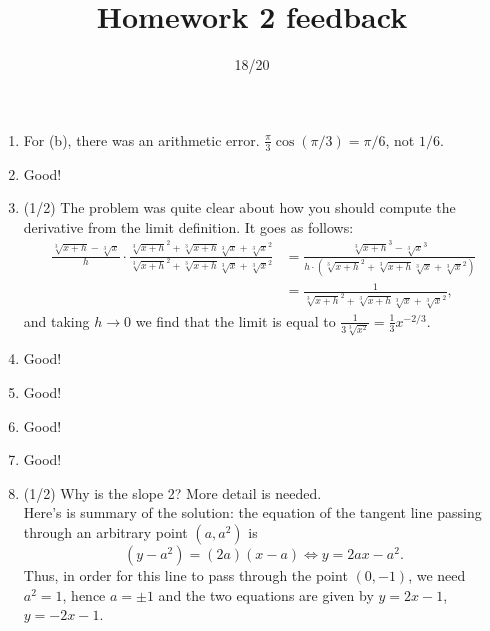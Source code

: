 \documentclass{article}
\title{Homework 2 feedback}
\author{}
\date{18/20}
\begin{document}
\maketitle
\begin{enumerate}
	\item For (b), there was an arithmetic error. $\frac{\pi}{3} \cos(\pi/3) = \pi/6$, not $1/6$.
	\item Good!
	\item (1/2) The problem was quite clear about how you should compute the derivative from the limit definition. It goes as follows:
		\begin{align*}
			\frac{\sqrt[3]{x+h} - \sqrt[3]{x}}{h} \cdot \frac{\sqrt[3]{x+h}^{2} + \sqrt[3]{x+h} \sqrt[3]{x} + \sqrt[3]{x}^{2}}{\sqrt[3]{x+h}^{2} + \sqrt[3]{x+h} \sqrt[3]{x} + \sqrt[3]{x}^{2}} &= \frac{\sqrt[3]{x+h}^{3} - \sqrt[3]{x}^{3}}{h \cdot (\sqrt[3]{x+h}^{2} + \sqrt[3]{x+h} \sqrt[3]{x} + \sqrt[3]{x}^{2})}\\
			&= \frac{1}{\sqrt[3]{x+h}^{2} + \sqrt[3]{x+h} \sqrt[3]{x} + \sqrt[3]{x}^{2}},
		\end{align*}
		and taking $h \to 0$ we find that the limit is equal to $\frac{1}{3 \sqrt[3]{x^{2}}} = \frac{1}{3} x^{-2/3}$.
	\item Good!
	\item Good!
	\item Good!
	\item Good!
	\item (1/2) Why is the slope 2? More detail is needed.\\
		Here's is summary of the solution: the equation of the tangent line passing through an arbitrary point $(a, a^{2})$ is 
		\[
			(y - a^{2}) = (2a) (x - a) \Leftrightarrow y = 2ax - a^{2}.
		\]
		Thus, in order for this line to pass through the point $(0, -1)$, we need $a^{2} = 1$, hence $a = \pm 1$ and the two equations are given by $y = 2x -1$, $y = -2x - 1$.
\end{enumerate}
\end{document}
